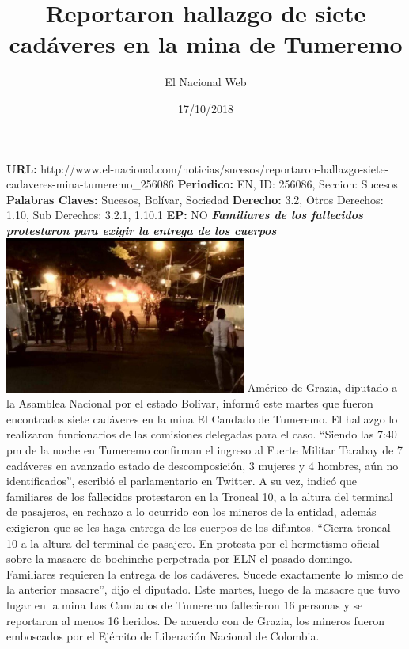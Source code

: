 \documentclass{article}%
\title{\textbf{Reportaron hallazgo de siete cadáveres en la mina de Tumeremo}}%
\author{El Nacional Web}%
\date{17/10/2018}%
\begin{document}
%
\normalsize%
\maketitle%
\textbf{URL: }%
http://www.el{-}nacional.com/noticias/sucesos/reportaron{-}hallazgo{-}siete{-}cadaveres{-}mina{-}tumeremo\_256086\newline%
%
\textbf{Periodico: }%
EN, %
ID: %
256086, %
Seccion: %
Sucesos\newline%
%
\textbf{Palabras Claves: }%
Sucesos, Bolívar, Sociedad\newline%
%
\textbf{Derecho: }%
3.2, %
Otros Derechos: %
1.10, %
Sub Derechos: %
3.2.1, 1.10.1\newline%
%
\textbf{EP: }%
NO\newline%
\newline%
%
\textbf{\textit{Familiares de los fallecidos protestaron para exigir la entrega de los cuerpos}}%
\newline%
\newline%
%
\includegraphics[width=300px]{147.jpg}%
\newline%
%
Américo de Grazia, diputado a la Asamblea Nacional por el estado Bolívar, informó este martes que fueron encontrados siete cadáveres en la mina El Candado de Tumeremo. El hallazgo lo realizaron funcionarios de las comisiones delegadas para el caso.%
\newline%
%
“Siendo las 7:40 pm de la noche en Tumeremo confirman el ingreso al Fuerte Militar Tarabay de 7 cadáveres en avanzado estado de descomposición, 3 mujeres y 4 hombres, aún no identificados”, escribió el parlamentario en Twitter.%
\newline%
%
A su vez, indicó que familiares de los fallecidos protestaron en la Troncal 10, a la altura del terminal de pasajeros, en rechazo a lo ocurrido con los mineros de la entidad, además exigieron que se les haga entrega de los cuerpos de los difuntos.%
\newline%
%
“Cierra troncal 10 a la altura del terminal de pasajero. En protesta por el hermetismo oficial sobre la masacre de bochinche perpetrada por ELN el pasado domingo. Familiares requieren la entrega de los cadáveres. Sucede exactamente lo mismo de la anterior masacre”, dijo el diputado.%
\newline%
%
Este martes, luego de la masacre que tuvo lugar en la mina Los Candados de Tumeremo fallecieron 16 personas y se reportaron al menos 16 heridos. De acuerdo con de Grazia, los mineros fueron emboscados por el Ejército de Liberación Nacional de Colombia.%
\newline%
%
\end{document}
